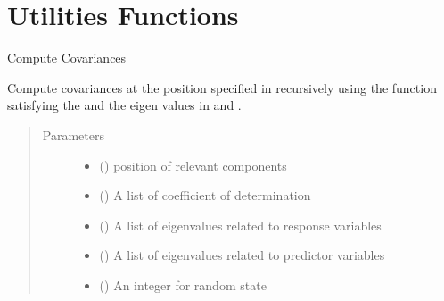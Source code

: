\documentclass[letterpaper,10pt,english]{sphinxmanual}
\begin{document}
\section{Utilities Functions}
\label{\detokenize{Utilities:module-pysimrel.utilities}}\label{\detokenize{Utilities:utilities-functions}}\label{\detokenize{Utilities::doc}}

\begin{fulllineitems}
\label{\detokenize{Utilities:pysimrel.utilities.get_cov}}
Compute Covariances

Compute covariances at the position specified in  recursively using the
function  satisfying the  and the eigen values in  and .
\begin{quote}\begin{description}
\item[{Parameters}] \leavevmode\begin{itemize}
\item {} 
 () \textendash{} position of relevant components

\item {} 
 () \textendash{} A list of coefficient of determination

\item {} 
 () \textendash{} A list of eigenvalues related to response variables

\item {} 
 () \textendash{} A list of eigenvalues related to predictor variables

\item {} 
 () \textendash{} An integer for random state


\end{itemize}
\end{description}
\end{quote}
\end{fulllineitems}
\end{document}
